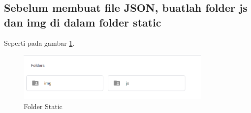 \subsection{Sebelum membuat file JSON, buatlah folder js dan img di dalam folder static}

Seperti pada gambar \ref{fig:fs}.
\begin{figure}[!htbp]
	\centerline{\includegraphics[width=0.85\textwidth]{figures/12/fs.PNG}}
	\caption{Folder Static}
	\label{fig:fs}
\end{figure}
